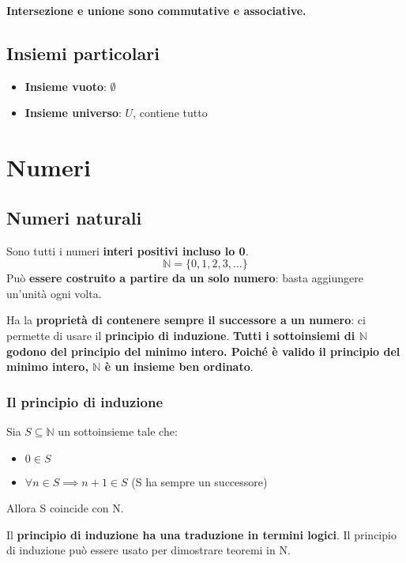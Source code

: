 \documentclass[a4paper,12pt,oneside]{article}
\begin{document}
\textbf{Intersezione e unione sono commutative e associative.}

\subsection{Insiemi particolari}
\begin{itemize}
    \item \textbf{Insieme vuoto}: $\emptyset$
    \item \textbf{Insieme universo}: $U$, contiene tutto
\end{itemize}

\section{Numeri}
\subsection{Numeri naturali}
Sono tutti i numeri \textbf{interi positivi incluso lo 0}.
\[
    \mathbb{N} = \{0, 1, 2, 3, \dots \}
\]
Può \textbf{essere costruito a partire da un solo numero}: basta aggiungere un'unità
ogni volta.

Ha la \textbf{proprietà di contenere sempre il successore a un numero}: ci
permette di usare il \textbf{principio di induzione}. \textbf{Tutti i
sottoinsiemi di $\mathbb{N}$ godono del principio del minimo intero. Poiché è
valido il principio del minimo intero, $\mathbb{N}$ è un insieme ben ordinato}.

\subsubsection{Il principio di induzione}
Sia $S \subseteq \mathbb{N}$ un sottoinsieme tale che:
\begin{itemize}
    \item $0 \in S$
    \item $\forall n \in S \implies n+1 \in S$ (S ha sempre un successore)
\end{itemize}

Allora S coincide con N.

Il \textbf{principio di induzione ha una traduzione in termini logici}. Il
principio di induzione può essere usato per dimostrare teoremi in N.
\end{document}
